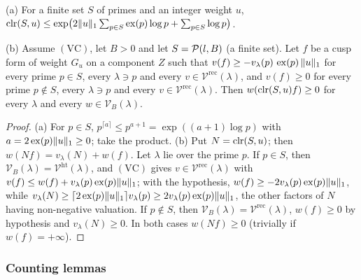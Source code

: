 \begin{lemma}\label{lem:pf:deepstr:clear}
\textup{(a)} For a finite set $S$ of primes and an integer weight $u$,
$\operatorname{clr}(S,u)\le\exp\bigl(2\|u\|_1\sum_{p\in S}\operatorname{ex}(p)\log p+\sum_{p\in S}\log p\bigr)$.

\textup{(b)} Assume $\mathrm{(VC)}$, let $B>0$ and let $S=\mathcal{P}(l,B)$ (a finite set). Let $f$ be a cusp
form of weight $G_u$ on a component $Z$ such that $v(f)\ge-v_\lambda(p)\,\operatorname{ex}(p)\,\|u\|_1$ for every prime
$p\in S$, every $\lambda\ni p$ and every $v\in\mathcal V^{\mathrm{rec}}(\lambda)$, and $v(f)\ge0$ for every prime
$p\notin S$, every $\lambda\ni p$ and every $v\in\mathcal V^{\mathrm{rec}}(\lambda)$. Then $w(\operatorname{clr}(S,u)f)\ge0$
for every $\lambda$ and every $w\in\mathcal V_B(\lambda)$.
\end{lemma}

\begin{proof}
(a) For $p\in S$, $p^{\lceil a\rceil}\le p^{a+1}=\exp((a+1)\log p)$ with $a=2\operatorname{ex}(p)\|u\|_1\ge0$; take the
product. (b) Put $N=\operatorname{clr}(S,u)$; then $w(Nf)=v_\lambda(N)+w(f)$. Let $\lambda$ lie over the prime $p$.
If $p\in S$, then $\mathcal V_B(\lambda)=\mathcal V^{\mathrm{ht}}(\lambda)$, and $\mathrm{(VC)}$ gives
$v\in\mathcal V^{\mathrm{rec}}(\lambda)$ with $v(f)\le w(f)+v_\lambda(p)\operatorname{ex}(p)\|u\|_1$; with the hypothesis,
$w(f)\ge-2v_\lambda(p)\operatorname{ex}(p)\|u\|_1$, while $v_\lambda(N)\ge\lceil2\operatorname{ex}(p)\|u\|_1\rceil v_\lambda(p)\ge
2v_\lambda(p)\operatorname{ex}(p)\|u\|_1$, the other factors of $N$ having non-negative valuation. If $p\notin S$, then
$\mathcal V_B(\lambda)=\mathcal V^{\mathrm{rec}}(\lambda)$, $w(f)\ge0$ by hypothesis and $v_\lambda(N)\ge0$. In both cases
$w(Nf)\ge0$ (trivially if $w(f)=+\infty$).
\end{proof}

\subsubsection*{Counting lemmas}

